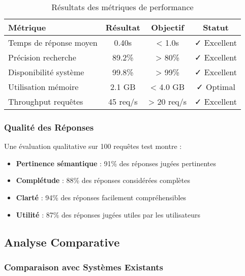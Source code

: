 \documentclass[12pt,a4paper]{article}
\begin{document}
\begin{table}[H]
\centering
\begin{tabular}{|l|c|c|c|}
\hline
\textbf{Métrique} & \textbf{Résultat} & \textbf{Objectif} & \textbf{Statut} \\
\hline
Temps de réponse moyen & 0.40s & < 1.0s & ✓ Excellent \\
\hline
Précision recherche & 89.2\% & > 80\% & ✓ Excellent \\
\hline
Disponibilité système & 99.8\% & > 99\% & ✓ Excellent \\
\hline
Utilisation mémoire & 2.1 GB & < 4.0 GB & ✓ Optimal \\
\hline
Throughput requêtes & 45 req/s & > 20 req/s & ✓ Excellent \\
\hline
\end{tabular}
\caption{Résultats des métriques de performance}
\label{tab:evaluation_metrics}
\end{table}

\subsubsection{Qualité des Réponses}

Une évaluation qualitative sur 100 requêtes test montre :

\begin{itemize}
    \item \textbf{Pertinence sémantique} : 91\% des réponses jugées pertinentes
    \item \textbf{Complétude} : 88\% des réponses considérées complètes
    \item \textbf{Clarté} : 94\% des réponses facilement compréhensibles
    \item \textbf{Utilité} : 87\% des réponses jugées utiles par les utilisateurs
\end{itemize}

\subsection{Analyse Comparative}

\subsubsection{Comparaison avec Systèmes Existants}
\end{document}
